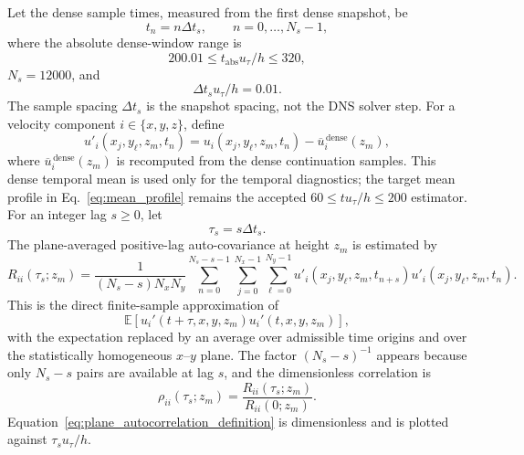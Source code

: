 \documentclass[11pt]{article}
\begin{document}
Let the dense sample times, measured from the first dense snapshot, be
\[
  t_n=n\Delta t_s,\qquad n=0,\ldots,N_s-1,
\]
where the absolute dense-window range is
\[
  200.01 \le t_{\mathrm{abs}}u_{\tau}/h \le 320,
\]
\(N_s=12000\), and
\[
  \Delta t_s u_{\tau}/h = 0.01.
\]
The sample spacing \(\Delta t_s\) is the snapshot spacing, not the DNS solver
step. For a velocity component \(i\in\{x,y,z\}\), define
\[
  u'_i(x_j,y_\ell,z_m,t_n)
  =
  u_i(x_j,y_\ell,z_m,t_n)-\overline{u}^{\,\mathrm{dense}}_i(z_m),
\]
where \(\overline{u}^{\,\mathrm{dense}}_i(z_m)\) is recomputed from the dense
continuation samples. This dense temporal mean is used only for the temporal
diagnostics; the target mean profile in Eq.~\eqref{eq:mean_profile} remains the
accepted \(60\le t u_{\tau}/h\le200\) estimator.
For an integer lag \(s\ge0\), let
\[
  \tau_s=s\Delta t_s.
\]
The plane-averaged positive-lag auto-covariance at height \(z_m\) is estimated
by
\begin{equation}
  R_{ii}(\tau_s;z_m)
  =
  \frac{1}{(N_s-s)N_xN_y}
  \sum_{n=0}^{N_s-s-1}
  \sum_{j=0}^{N_x-1}
  \sum_{\ell=0}^{N_y-1}
  u'_i(x_j,y_\ell,z_m,t_{n+s})
  u'_i(x_j,y_\ell,z_m,t_n).
  \label{eq:plane_autocovariance_estimator}
\end{equation}
This is the direct finite-sample approximation of
\[
  \mathbb{E}\left[
  u_i'(t+\tau,x,y,z_m)u_i'(t,x,y,z_m)
  \right],
\]
with the expectation replaced by an average over admissible time origins and
over the statistically homogeneous \(x\)--\(y\) plane. The factor
\((N_s-s)^{-1}\) appears because only \(N_s-s\) pairs are available at lag
\(s\), and the dimensionless correlation is
\begin{equation}
  \rho_{ii}(\tau_s;z_m)
  =
  \frac{R_{ii}(\tau_s;z_m)}{R_{ii}(0;z_m)}.
  \label{eq:plane_autocorrelation_definition}
\end{equation}
Equation~\eqref{eq:plane_autocorrelation_definition} is dimensionless and is
plotted against \(\tau_su_{\tau}/h\).
\end{document}
